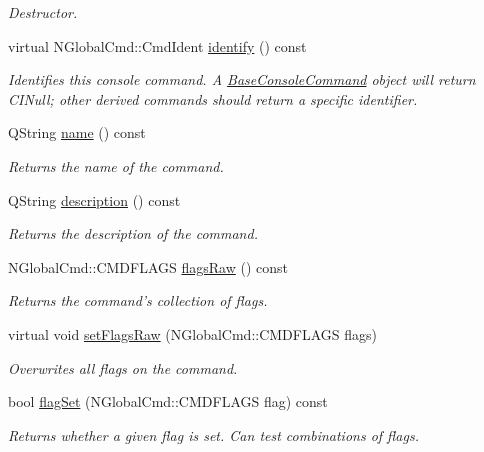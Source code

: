 \begin{DoxyCompactItemize}
\begin{DoxyCompactList}\small\item\em Destructor. \end{DoxyCompactList}\item 
virtual N\-Global\-Cmd\-::\-Cmd\-Ident \hyperlink{class_base_console_command_a8c1fe488f1e24c6bd4891225eb9bb122}{identify} () const 
\begin{DoxyCompactList}\small\item\em Identifies this console command. A \hyperlink{class_base_console_command}{Base\-Console\-Command} object will return C\-I\-Null; other derived commands should return a specific identifier. \end{DoxyCompactList}\item 
Q\-String \hyperlink{class_base_console_command_addf7b841bac36ffc45dd79ec1e697e52}{name} () const 
\begin{DoxyCompactList}\small\item\em Returns the name of the command. \end{DoxyCompactList}\item 
Q\-String \hyperlink{class_base_console_command_a8eaacc83646c4cca95a772a623343988}{description} () const 
\begin{DoxyCompactList}\small\item\em Returns the description of the command. \end{DoxyCompactList}\item 
N\-Global\-Cmd\-::\-C\-M\-D\-F\-L\-A\-G\-S \hyperlink{class_base_console_command_a2e8b8d3a73e0684c7992945fd5d0a216}{flags\-Raw} () const 
\begin{DoxyCompactList}\small\item\em Returns the command's collection of flags. \end{DoxyCompactList}\item 
virtual void \hyperlink{class_base_console_command_ac6ff6169ab06ae43d76d0b3c2e5336ff}{set\-Flags\-Raw} (N\-Global\-Cmd\-::\-C\-M\-D\-F\-L\-A\-G\-S flags)
\begin{DoxyCompactList}\small\item\em Overwrites all flags on the command. \end{DoxyCompactList}\item 
bool \hyperlink{class_base_console_command_a021a4299766424a10f1ec9398c6edb3e}{flag\-Set} (N\-Global\-Cmd\-::\-C\-M\-D\-F\-L\-A\-G\-S flag) const 
\begin{DoxyCompactList}\small\item\em Returns whether a given flag is set. Can test combinations of flags. \end{DoxyCompactList}\item 

\end{DoxyCompactItemize}

